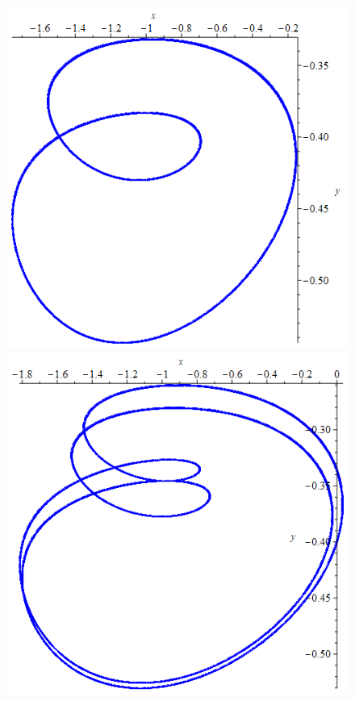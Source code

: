 \documentclass[10pt,a4paper]{article}
\begin{document}
\begin{figure}[h]
		{\includegraphics[scale=0.2]{Lab3 f=0.65}}
		{\includegraphics[scale=0.2]{Lab3 f=0.7}}

\end{figure}
\end{document}
